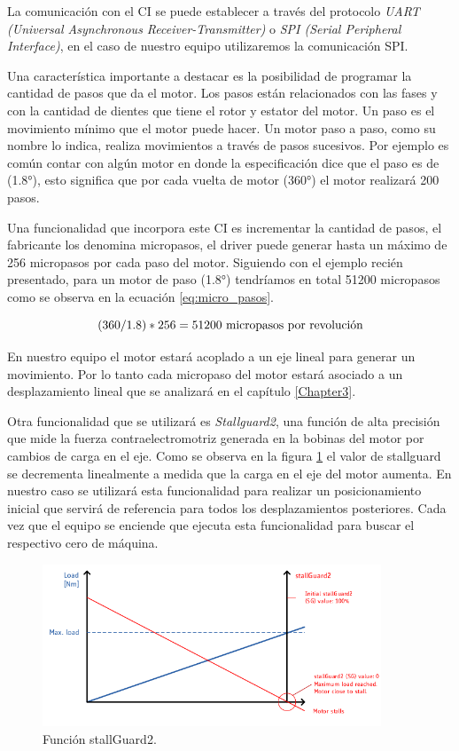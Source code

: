 La comunicación con el CI se puede establecer a través del protocolo \textit{ UART (Universal Asynchronous Receiver-Transmitter)} o \textit{SPI (Serial Peripheral Interface)}, en el caso de nuestro equipo utilizaremos la comunicación SPI.


Una característica importante a destacar es la posibilidad de programar la cantidad de pasos que da el motor. Los pasos están relacionados con las fases  y con la cantidad de dientes que tiene el rotor y estator del motor. Un paso es el movimiento mínimo que el motor puede hacer. Un motor paso a paso, como su nombre lo indica, realiza movimientos a través de pasos sucesivos. Por ejemplo es común contar con algún motor en donde la especificación dice que el paso es de (\ang{1.8}), esto significa que por cada vuelta de motor (\ang{360}) el motor realizará 200 pasos.

Una funcionalidad que incorpora este CI es incrementar la cantidad de pasos, el fabricante los denomina micropasos, el driver puede generar hasta un máximo de 256 micropasos por cada paso del motor. Siguiendo con el ejemplo recién presentado, para un motor de paso (\ang{1.8}) tendríamos en total 51200 micropasos como se observa en la ecuación \ref{eq:micro_pasos}.

\begin{equation}
	\label{eq:micro_pasos}
		(360/1.8) * 256 = 51200 \textup{ micropasos por revolución}
\end{equation}

En nuestro equipo el motor estará acoplado a un eje lineal para generar un movimiento. Por lo tanto cada micropaso del motor estará asociado a un desplazamiento lineal que se analizará en el capítulo \ref{Chapter3}.

Otra funcionalidad que se utilizará es \textit{Stallguard2}, una función de alta precisión que mide la fuerza contraelectromotriz generada en la bobinas del motor por cambios de carga en el eje. Como se observa en la figura \ref{fig:tmc5130_stallGuard2} el valor de stallguard se decrementa linealmente a medida que la carga en el eje del motor aumenta. En nuestro caso se utilizará esta funcionalidad para realizar un posicionamiento inicial que servirá de referencia para todos los desplazamientos posteriores. Cada vez que el equipo se enciende que ejecuta esta funcionalidad para buscar el respectivo cero de máquina.
     
\begin{figure}[htpb]
\centering 
\includegraphics[width=0.9\textwidth]{./Figures/tmc5130_stallguard2.png}
\caption{Función stallGuard2.}
\label{fig:tmc5130_stallGuard2}
\end{figure}

